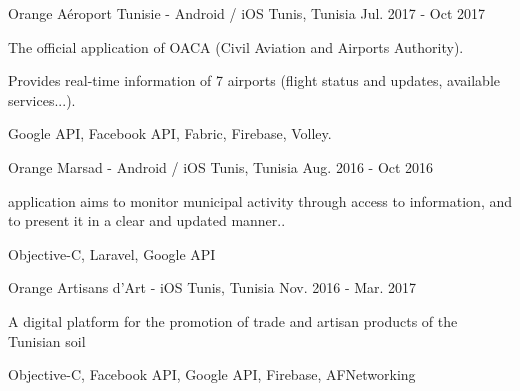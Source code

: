 

\begin{cventries}

  \cventrydetailed
    {Orange} %
    {Aéroport Tunisie - Android / iOS} %
    {Tunis, Tunisia} %
    {Jul. 2017 - Oct 2017} %
    {
      \begin{cvitems} %
        \item {The official application of OACA (Civil Aviation and Airports Authority).}
        \item {Provides real-time information of 7 airports (flight status and updates, available services...).}
      \end{cvitems}
    }
    {Google API, Facebook API, Fabric, Firebase, Volley.} %
    
  \cventrydetailed
    {Orange} %
	{Marsad - Android / iOS} %
	{Tunis, Tunisia} %
	{Aug. 2016 - Oct 2016} %
	{
		\begin{cvitems} %
			\item {application aims to monitor municipal activity through access to information, and to present it in a clear and updated manner..}
		\end{cvitems}
	}
	{Objective-C, Laravel, Google API} %

  \cventrydetailed
    {Orange} %
    {Artisans d'Art - iOS} %
    {Tunis, Tunisia} %
    {Nov. 2016 - Mar. 2017} %
    {
      \begin{cvitems} %
        \item {A digital platform for the promotion of trade and artisan products of the Tunisian soil}
      \end{cvitems}
    }
    {Objective-C, Facebook API, Google API, Firebase, AFNetworking} %
    

\end{cventries}
